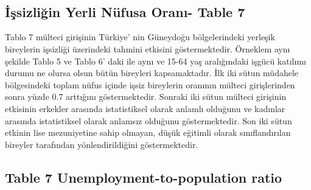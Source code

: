 \documentclass{article}
\begin{document}
\
{
\def\sym#1{\ifmmode^{#1}\else\(^{#1}\)\fi}

\
\newpage
    \subsection*{İşsizliğin Yerli Nüfusa Oranı- Table 7}
    Tablo 7 mülteci girişinin Türkiye’ nin Güneydoğu bölgelerindeki yerleşik bireylerin işsizliği üzerindeki tahmini etkisini göstermektedir. Örneklem aynı şekilde Tablo 5 ve Tablo 6’ daki ile aynı ve 15-64 yaş aralığındaki işgücü katılımı durumu ne olursa olsun bütün bireyleri kapsamaktadır. İlk iki sütun müdahele bölgesindeki toplam nüfus içinde işsiz bireylerin oranının mülteci girişlerinden sonra yüzde 0.7 arttığını göstermektedir. Sonraki iki sütun mülteci girişinin etkisinin erkekler arasında istatistiksel olarak anlamlı olduğunu ve kadınlar arasında istatistiksel olarak anlamsız olduğunu göstermektedir. Son iki sütun etkinin lise mezuniyetine sahip olmayan, düşük eğitimli olarak sınıflandırılan bireyler tarafından yönlendirildiğini göstermektedir. 
\subsection*{Table 7 Unemployment-to-population ratio}

\begin{tabular}{l*{6}{c}}
\hline


\end{tabular}}
\end{document}
